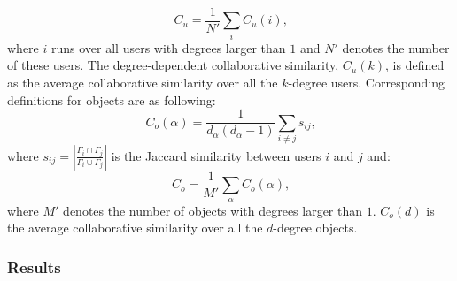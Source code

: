       \begin{equation}
        C_u = \frac{1}{N\prime} \sum_{i} C_u(i)\mbox{,}
      \end{equation}
      where $i$ runs over all users with degrees larger than $1$ and $N\prime$ denotes the number of these users. The degree-dependent collaborative similarity, $C_u(k)$, is defined as the average collaborative similarity over all the $k$-degree users. Corresponding definitions for objects are as following:
      \begin{equation}
        C_o(\alpha) = \frac{1}{d_\alpha(d_\alpha-1)} \sum_{i\neq j} s_{ij}\mbox{,}
      \end{equation}
      where $s_{ij} = \left| \frac{\Gamma_i \cap \Gamma_j}{\Gamma_i \cup \Gamma_j} \right|$ is the Jaccard similarity between users $i$ and $j$ and:
      \begin{equation}
        C_o = \frac{1}{M\prime} \sum_\alpha C_o(\alpha)\mbox{,}
      \end{equation}
      where $M\prime$ denotes the number of objects with degrees larger than $1$. $C_o(d)$ is the average collaborative similarity over all the $d$-degree objects.

    \subsubsection{Results}
    
